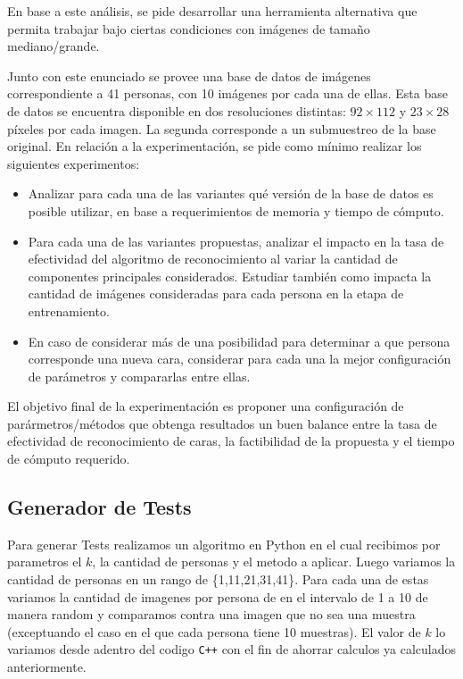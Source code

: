 En base a este an\'alisis, se pide desarrollar una herramienta alternativa que permita trabajar bajo ciertas condiciones
con im\'agenes de tama\~no mediano/grande.

Junto con este enunciado se provee una base de datos de im\'agenes correspondiente a 41 personas, con 10
im\'agenes por cada una de ellas. Esta base de datos se encuentra disponible en dos resoluciones distintas: $92 \times
112$ y $23 \times 28$ p\'ixeles por cada imagen. La segunda corresponde a un submuestreo de la base original.
En relaci\'on a la experimentaci\'on, se pide como m\'inimo realizar los siguientes experimentos:
\begin{itemize}
\item Analizar para cada una de las variantes qu\'e versi\'on de la base de datos es posible utilizar, en base a
requerimientos de memoria y tiempo de c\'omputo.

\item Para cada una de las variantes propuestas, analizar el impacto en la tasa de efectividad del algoritmo de reconocimiento al
variar la cantidad de componentes principales considerados. Estudiar tambi\'en como impacta la cantidad de im\'agenes
consideradas para cada persona en la etapa de entrenamiento.

\item En caso de considerar m\'as de una posibilidad para determinar a que persona corresponde una nueva cara,
considerar para cada una la mejor configuraci\'on de par\'ametros y compararlas entre ellas.
\end{itemize}

El objetivo final de la experimentaci\'on es proponer una configuraci\'on de par\'armetros/m\'etodos que obtenga
resultados un buen balance entre la tasa de efectividad de reconocimiento de caras, la factibilidad de la propuesta y el
tiempo de c\'omputo requerido.





\subsection{Generador de Tests}

Para generar Tests realizamos un algoritmo en Python en el cual recibimos por parametros el $k$, la cantidad de personas y el metodo a aplicar. Luego variamos la cantidad de personas en un rango de \{1,11,21,31,41\}. Para cada una de estas  variamos la cantidad de imagenes por persona de en el intervalo de 1 a 10 de manera random y comparamos contra una imagen que no sea una muestra (exceptuando el caso en el que cada persona tiene 10 muestras).
El valor de $k$ lo variamos desde adentro del codigo \verb-C++- con el fin de ahorrar calculos ya calculados anteriormente.

